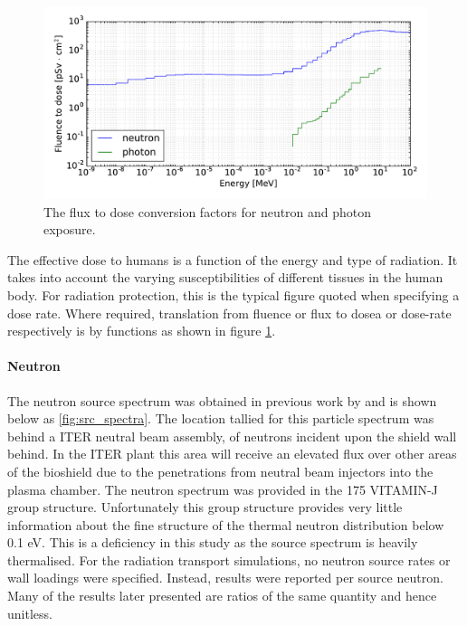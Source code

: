 \begin{figure}[H]
  \includegraphics[width=\textwidth]{icrp74}
  \caption{The flux to dose conversion factors for neutron and photon exposure.}
  \label{fig:icrp74}
\end{figure}

The effective dose to humans is a function of the energy and type of radiation. It takes into account the varying susceptibilities of different tissues in the human body. For radiation protection, this is the typical figure quoted when specifying a dose rate. Where required, translation from fluence or flux to dosea or dose-rate respectively is by functions as shown in figure \ref{fig:icrp74}.

\paragraph{Neutron}
The neutron source spectrum was obtained in previous work by \citeauthor{Jakhar16} and is shown below as \ref{fig:src_spectra}. The location tallied for this particle spectrum was behind a ITER neutral beam assembly, of neutrons incident upon the shield wall behind. In the ITER plant this area will receive an elevated flux over other areas of the bioshield due to the penetrations from neutral beam injectors into the plasma chamber. The neutron spectrum was provided in the 175 VITAMIN-J group structure. Unfortunately this group structure provides very little information about the fine structure of the thermal neutron distribution below 0.1 eV. This is a deficiency in this study as the source spectrum is heavily thermalised. For the radiation transport simulations, no neutron source rates or wall loadings were specified. Instead, results were reported per source neutron. Many of the results later presented are ratios of the same quantity and hence unitless. 

